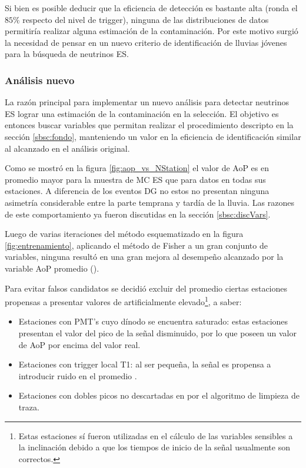 	Si bien es posible deducir que la eficiencia de detección es bastante alta (ronda el $85\%$ respecto del nivel de trigger), ninguna de las distribuciones de datos permitiría realizar alguna estimación de la contaminación.
	Por este motivo surgió la necesidad de pensar en un nuevo criterio de identificación de lluvias jóvenes para la búsqueda de neutrinos ES.
	
	\subsubsection{Análisis nuevo}
	
	La razón principal para implementar un nuevo análisis para detectar neutrinos ES lograr una estimación de la contaminación en la selección.
	El objetivo es entonces buscar variables que permitan realizar el procedimiento descripto en la sección \ref{sbsc:fondo}, manteniendo un valor en la eficiencia de identificación similar al alcanzado en el análisis original.
	
	Como se mostró en la figura \ref{fig:aop_vs_NStation} el valor de AoP es en promedio mayor para la muestra de MC ES que para datos en todas sus estaciones.
	A diferencia de los eventos DG no estos no presentan ninguna asimetría considerable entre la parte temprana y tardía de la lluvia.
	Las razones de este comportamiento ya fueron discutidas en la sección \ref{sbsc:discVars}.
	
	Luego de varias iteraciones del método esquematizado en la figura \ref{fig:entrenamiento}, aplicando el método de Fisher a un gran conjunto de variables, ninguna resultó en una gran mejora al desempeño alcanzado por la variable AoP promedio (\aop{}).
	
	Para evitar falsos candidatos se decidió excluir del promedio ciertas estaciones propensas a presentar valores de \aop{} artificialmente elevado\footnote{Estas estaciones sí fueron utilizadas en el cálculo de las variables sensibles a la inclinación debido a que los tiempos de inicio de la señal usualmente son correctos.}, a saber:
	\begin{itemize}
	 \item Estaciones con PMT's cuyo dínodo se encuentra saturado: estas estaciones presentan el valor del pico de la señal disminuido, por lo que poseen un valor de AoP por encima del valor real.
	 \item Estaciones con trigger local T1: al ser pequeña, la señal es propensa a introducir ruido en el promedio \aop{}.
	 \item Estaciones con dobles picos no descartadas en por el algoritmo de limpieza de traza.
	\end{itemize}
	
